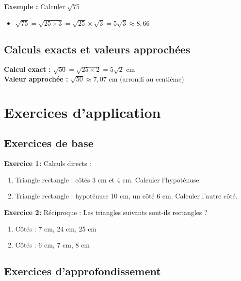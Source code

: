\textbf{Exemple :} Calculer $\sqrt{75}$
\begin{itemize}
    \item $\sqrt{75} = \sqrt{25 \times 3} = \sqrt{25} \times \sqrt{3} = 5\sqrt{3} \approx 8,66$
\end{itemize}

\subsection{Calculs exacts et valeurs approchées}

\textbf{Calcul exact :} $\sqrt{50} = \sqrt{25 \times 2} = 5\sqrt{2}$ cm\\
\textbf{Valeur approchée :} $\sqrt{50} \approx 7,07$ cm (arrondi au centième)



\section{Exercices d'application}

\subsection{Exercices de base}

\begin{exercisebox}
\textbf{Exercice 1:} Calculs directs :
\begin{enumerate}[label=\alph*)]
    \item Triangle rectangle : côtés 3 cm et 4 cm. Calculer l'hypoténuse.
    \item Triangle rectangle : hypoténuse 10 cm, un côté 6 cm. Calculer l'autre côté.
\end{enumerate}

\textbf{Exercice 2:}
Réciproque : Les triangles suivants sont-ils rectangles ?
\begin{enumerate}[label=\alph*)]
	\item Côtés : 7 cm, 24 cm, 25 cm
	\item Côtés : 6 cm, 7 cm, 8 cm
\end{enumerate}
\end{exercisebox}

\subsection{Exercices d'approfondissement}

